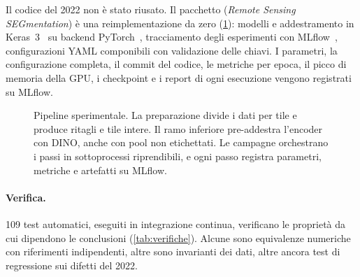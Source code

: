 Il codice del 2022 non è stato riusato. Il pacchetto \rsseg{} (\emph{Remote Sensing
SEGmentation}) è una reimplementazione da zero (\cref{fig:pipeline}): modelli e addestramento in
Keras~3~\cite{chollet2015keras} su backend PyTorch~\cite{paszke2019pytorch}, tracciamento degli
esperimenti con MLflow~\cite{zaharia2018mlflow}, configurazioni YAML componibili con validazione
delle chiavi. I parametri, la configurazione completa, il commit del codice, le metriche per
epoca, il picco di memoria della GPU, i checkpoint e i report di ogni esecuzione vengono
registrati su MLflow.

\begin{figure}[t]
  \centering
  \resizebox{\linewidth}{!}{}
  \caption[Pipeline sperimentale]{Pipeline sperimentale. La preparazione divide i dati per tile
    e produce ritagli e tile intere. Il ramo inferiore pre-addestra l'encoder con DINO, anche con
    pool non etichettati. Le campagne orchestrano i passi in sottoprocessi riprendibili, e ogni
    passo registra parametri, metriche e artefatti su MLflow.}
  \label{fig:pipeline}
\end{figure}

\paragraph{Verifica.}
109 test automatici, eseguiti in integrazione continua, verificano le proprietà da cui dipendono
le conclusioni (\cref{tab:verifiche}). Alcune sono equivalenze numeriche con riferimenti
indipendenti, altre sono invarianti dei dati, altre ancora test di regressione sui difetti del
2022.

